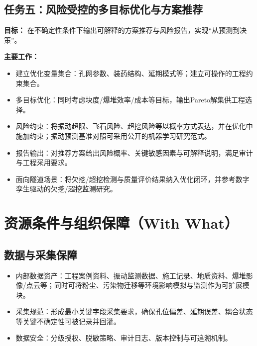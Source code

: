 \documentclass[12pt,a4paper,fontset=mac]{ctexart}
\begin{document}
\subsection{任务五：风险受控的多目标优化与方案推荐}
\textbf{目标：} 在不确定性条件下输出可解释的方案推荐与风险报告，实现“从预测到决策”。

\textbf{主要工作：}
\begin{itemize}
  \item 建立优化变量集合：孔网参数、装药结构、延期模式等；建立可操作的工程约束集合。
  \item 多目标优化：同时考虑块度/爆堆效率/成本等目标，输出Pareto解集供工程选择。
  \item 风险约束：将振动超限、飞石风险、超挖风险等以概率方式表达，并在优化中施加约束；振动预测基准对照可采用公开的机器学习研究范式\cite{Hosseini2023PPVEnsemble,Komadja2022SustainabilityPPV,Chen2025CatBoostPPV}。
  \item 报告输出：对推荐方案给出风险概率、关键敏感因素与可解释说明，满足审计与工程采用要求。
  \item 面向隧道场景：将欠挖/超挖检测与质量评价结果纳入优化闭环，并参考数字孪生驱动的欠挖/超挖监测研究\cite{Pan2025DTOverbreak,Fang2024StatusDTOverUnderExcavation}。
\end{itemize}

\section{资源条件与组织保障（With What）}

\subsection{数据与采集保障}
\begin{itemize}
  \item 内部数据资产：工程案例资料、振动监测数据、施工记录、地质资料、爆堆影像/点云等；同时可将粉尘、污染物迁移等环境影响模拟与监测作为可扩展模块\cite{Jia2022DustSuppressionBurningRock,Yin2022PollutantMigrationBlasting,Huang2019BlastingDustSimulation}。
  \item 采集规范：形成最小关键字段采集要求，确保孔位偏差、延期误差、耦合状态等关键不确定性可被记录并回灌。
  \item 数据安全：分级授权、脱敏策略、审计日志、版本控制与可追溯机制。
\end{itemize}
\end{document}
